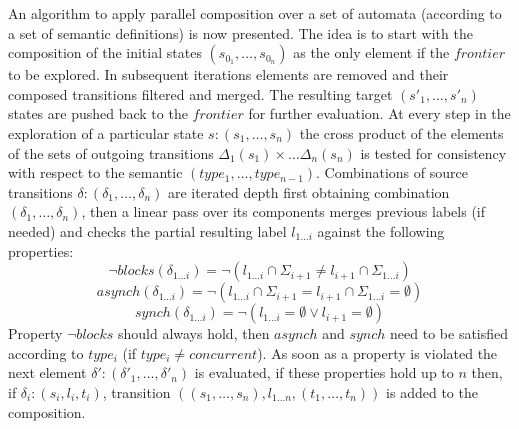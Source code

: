 
%		 
An algorithm to apply parallel composition over a set of automata (according to a set of semantic definitions) is now presented.  The idea is to start with the composition of the initial states $(s_{0_1},\ldots,s_{0_n})$ as the only element if the $frontier$ to be explored. In subsequent iterations elements are removed and their composed transitions filtered and merged. The resulting target $(s'_1,\ldots,s'_n)$ states are pushed back to the $frontier$ for further evaluation. At every step in the exploration of a particular state $s:(s_1,\ldots,s_n)$ the cross product of the elements of the sets of outgoing transitions $\Delta_1(s_1) \times \ldots \Delta_n(s_n)$ is tested for consistency with respect to the  semantic $(type_1,\ldots,type_{n-1})$. Combinations of source transitions $\delta:(\delta_1,\ldots,\delta_n)$ are iterated depth first obtaining combination $(\delta_1,\ldots,\delta_n)$, then a linear pass over its components merges previous labels (if needed) and checks the partial resulting label $l_{1\ldots i}$  against the following properties:
\[\neg blocks(\delta_{1\ldots i})= \neg(l_{1\ldots i}\cap \Sigma_{i+1} \neq l_{i+1} \cap \Sigma_{1\ldots i}) \]
\[asynch(\delta_{1\ldots i})= \neg (l_{1\ldots i}\cap \Sigma_{i+1} = l_{i+1} \cap \Sigma_{1\ldots i}=\emptyset) \]
\[synch(\delta_{1\ldots i})= \neg (l_{1\ldots i}=\emptyset \vee l_{i+1} =\emptyset) \]
Property $\neg blocks$ should always hold, then $asynch$ and $synch$ need to be satisfied according to $type_i$ (if $type_i \neq concurrent$). As soon as a property is violated the next element $\delta':(\delta'_1,\ldots,\delta'_n)$ is evaluated, if these properties hold up to $n$ then, if $\delta_{i}:(s_i,l_i,t_i)$, transition
$((s_1,\ldots,s_n),l_{1\ldots n},(t_1,\ldots,t_n))$ is added to the composition.


